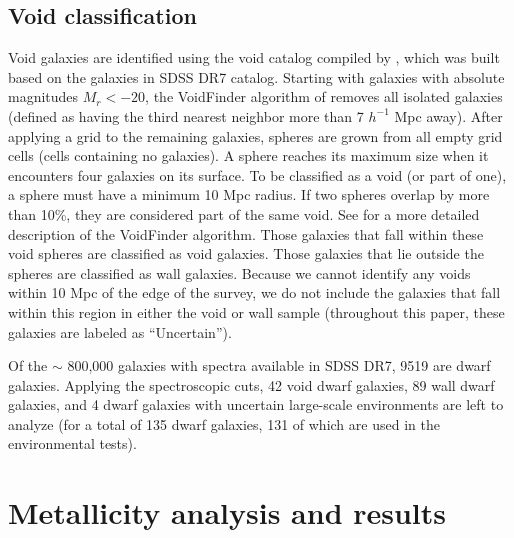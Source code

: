 \subsection{Void classification}

Void galaxies are identified using the void catalog compiled by \cite{Pan12}, 
which was built based on the galaxies in SDSS DR7 catalog.  Starting with 
galaxies with absolute magnitudes $M_r < -20$, the VoidFinder algorithm of 
\cite{Hoyle02} removes all isolated galaxies (defined as having the third 
nearest neighbor more than 7 $h^{-1}$ Mpc away).  After applying a grid to the 
remaining galaxies, spheres are grown from all empty grid cells (cells 
containing no galaxies).  A sphere reaches its maximum size when it encounters 
four galaxies on its surface.  To be classified as a void (or part of one), a 
sphere must have a minimum 10 Mpc radius.  If two spheres overlap by more than 
10\%, they are considered part of the same void.  See \cite{Hoyle02} for a more 
detailed description of the VoidFinder algorithm.  Those galaxies that fall 
within these void spheres are classified as void galaxies.  Those galaxies that 
lie outside the spheres are classified as wall galaxies.  Because we cannot 
identify any voids within 10 Mpc of the edge of the survey, we do not include 
the galaxies that fall within this region in either the void or wall sample 
(throughout this paper, these galaxies are labeled as ``Uncertain'').

Of the $\sim$ 800,000 galaxies with spectra available in SDSS DR7, 9519 are 
dwarf galaxies.  Applying the spectroscopic cuts, 42 void dwarf galaxies, 89 
wall dwarf galaxies, and 4 dwarf galaxies with uncertain large-scale 
environments are left to analyze (for a total of 135 dwarf galaxies, 131 of 
which are used in the environmental tests).


\section[Results]{Metallicity analysis and results}

